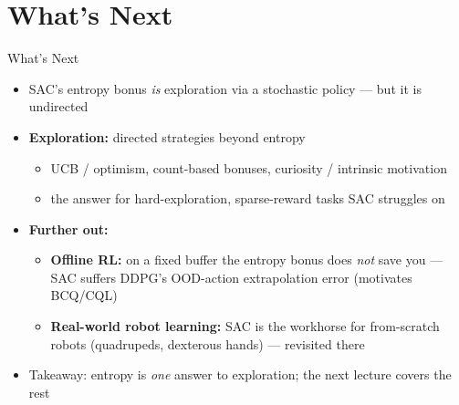 \section{What's Next}
\begin{frame}{What's Next}
\begin{itemize}
    \item SAC's entropy bonus \emph{is} exploration via a stochastic policy --- but it is undirected
    \item \textbf{Exploration:} directed strategies beyond entropy
    \begin{itemize}
        \item UCB / optimism, count-based bonuses, curiosity / intrinsic motivation
        \item the answer for hard-exploration, sparse-reward tasks SAC struggles on
    \end{itemize}
    \item \textbf{Further out:}
    \begin{itemize}
        \item \textbf{Offline RL:} on a fixed buffer the entropy bonus does \emph{not} save you --- SAC suffers DDPG's OOD-action extrapolation error (motivates BCQ/CQL)
        \item \textbf{Real-world robot learning:} SAC is the workhorse for from-scratch robots (quadrupeds, dexterous hands) --- revisited there
    \end{itemize}
    \item Takeaway: entropy is \emph{one} answer to exploration; the next lecture covers the rest
\end{itemize}
\end{frame}
